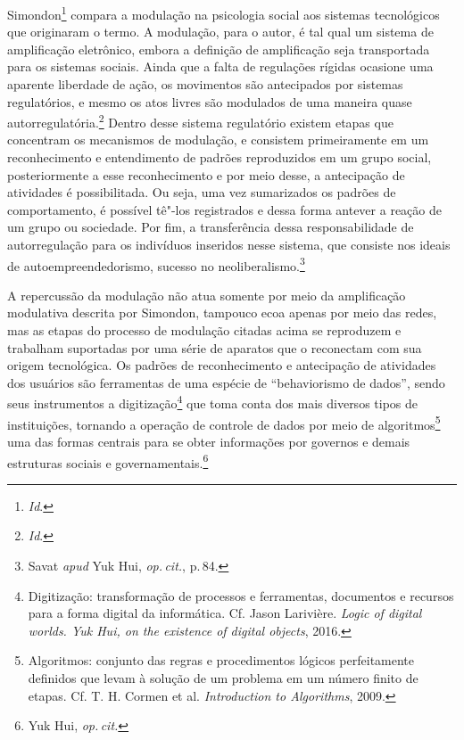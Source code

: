 Simondon\footnote{\textit{Id}.} compara a modulação na psicologia social
aos sistemas tecnológicos que originaram o termo. A modulação, para o
autor, é tal qual um sistema de amplificação eletrônico, embora a
definição de amplificação seja transportada para os sistemas sociais.
Ainda que a falta de regulações rígidas ocasione uma aparente liberdade
de ação, os movimentos são antecipados por sistemas regulatórios, e
mesmo os atos livres são modulados de uma maneira quase autorregulatória.\footnote{\textit{Id}.}
Dentro desse sistema regulatório existem etapas que
concentram os mecanismos de modulação, e consistem primeiramente em um
reconhecimento e entendimento de padrões reproduzidos em um grupo
social, posteriormente a esse reconhecimento e por meio desse, a
antecipação de atividades é possibilitada. Ou seja, uma vez sumarizados
os padrões de comportamento, é possível tê"-los registrados e dessa forma
antever a reação de um grupo ou sociedade. Por fim, a transferência
dessa responsabilidade de autorregulação para os indivíduos inseridos
nesse sistema, que consiste nos ideais de autoempreendedorismo, sucesso
no neoliberalismo.\footnote{Savat \textit{apud} Yuk Hui, \textit{op.\,cit.}, p.\,84.}

A repercussão da modulação não atua somente por meio da amplificação
modulativa descrita por Simondon, tampouco ecoa apenas por meio das
redes, mas as etapas do processo de modulação citadas acima se
reproduzem e trabalham suportadas por uma série de aparatos que o
reconectam com sua origem tecnológica. Os padrões de reconhecimento e
antecipação de atividades dos usuários são ferramentas de uma espécie de
``behaviorismo de dados'', sendo seus instrumentos a
digitização\footnote{Digitização: transformação de processos e
  ferramentas, documentos e recursos para a forma digital da informática. Cf. Jason Larivière. \textit{Logic of digital worlds. Yuk Hui, on the
existence of digital objects}, 2016.} que toma conta dos mais diversos tipos de
instituições, tornando a operação de controle de dados por meio de
algoritmos\footnote{Algoritmos: conjunto das regras e procedimentos
  lógicos perfeitamente definidos que levam à solução de um problema em
  um número finito de etapas. Cf. T. H. Cormen et al. \textit{Introduction to Algorithms}, 2009.} uma das formas centrais para se obter
informações por governos e demais estruturas sociais e governamentais.\footnote{Yuk Hui, \textit{op.\,cit.}}

